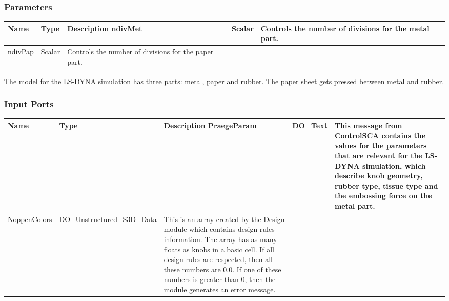 \begin{htmlonly}
%



%
%

%
\subsubsection{Parameters}
%


\begin{longtable}{|p{3.5cm}|p{2cm}|p{8.5cm}|}
\hline
   \bf{Name} & \bf{Type} & \bf{Description} \endhead
\hline\hline
	ndivMet & Scalar & Controls the number of divisions for the metal part.\\
\hline
	ndivPap & Scalar & Controls the number of divisions for the paper part.\\
\hline
\end{longtable}

The model for the LS-DYNA simulation has three parts: metal, paper and rubber.
The paper sheet gets pressed between metal and rubber.


%
\subsubsection{Input Ports}
%


\begin{longtable}{|p{3.5cm}|p{4cm}|p{7cm}|}
\hline
   \bf{Name} & \bf{Type} & \bf{Description} \endhead
\hline\hline
	\textcolor{required}{PraegeParam} & DO\_Text & 
                 This message from ControlSCA
                 contains the values for the parameters
                 that are relevant for the LS-DYNA simulation,
                 which describe
                 knob geometry, rubber type, tissue type and the
                 embossing force on the metal part.\\
\hline
	\textcolor{required}{NoppenColors} & DO\_Unstructured\_S3D\_Data
				       & 
                    This is an array created by the Design module
                    which contains design rules information.
                    The array has as many floats as knobs in
                    a basic cell. If all design rules are respected,
                    then all these numbers are 0.0. If one of these
                    numbers is greater than 0, then the module 
                    generates an error message.\\ 
                     

\end{longtable}
\end{htmlonly}
